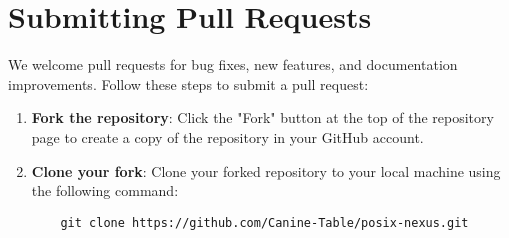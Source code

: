 \section{Submitting Pull Requests}
We welcome pull requests for bug fixes, new features, and documentation improvements. Follow these steps to submit a pull request:
\begin{enumerate}
    \item \textbf{Fork the repository}: Click the "Fork" button at the top of the repository page to create a copy of the repository in your GitHub account.
    \item \textbf{Clone your fork}: Clone your forked repository to your local machine using the following command:
    \begin{lstlisting}
    git clone https://github.com/Canine-Table/posix-nexus.git
    \end{lstlisting}
\end{enumerate}
\newpage